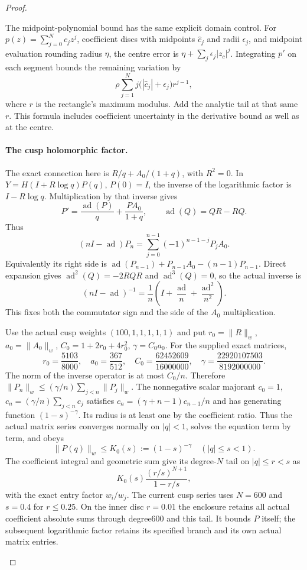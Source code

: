 \documentclass[11pt,a4paper]{article}
\theoremstyle{definition}
\begin{document}
\begin{proof}
\begin{enumerate}[label=\arabic*.]
The midpoint-polynomial bound has the same explicit domain
control. For $p(z)=\sum_{j=0}^Nc_jz^j$, coefficient discs with
midpoints $\widehat c_j$ and radii $\epsilon_j$, and midpoint
evaluation rounding radius $\eta$, the centre error is
$\eta+\sum_j\epsilon_j|z_c|^j$. Integrating $p'$ on each segment
bounds the remaining variation by
\[
 \rho\sum_{j=1}^N j\bigl(|\widehat c_j|+\epsilon_j\bigr)r^{j-1},
\]
where $r$ is the rectangle's maximum modulus. Add the analytic
tail at that same $r$. This formula includes coefficient
uncertainty in the derivative bound as well as at the centre.

\paragraph{The cusp holomorphic factor.}
The exact connection here is
$R/q+A_0/(1+q)$, with $R^2=0$. In
$Y=H(I+R\log q)P(q)$, $P(0)=I$, the inverse of the logarithmic
factor is $I-R\log q$. Multiplication by that inverse gives
\[
 P'=\frac{\operatorname{ad}(P)}q+\frac{PA_0}{1+q},
 \qquad\operatorname{ad}(Q)=QR-RQ.
\]
Thus
\[
 (nI-\operatorname{ad})P_n
  =\sum_{j=0}^{n-1}(-1)^{n-1-j}P_jA_0.
\]
Equivalently its right side is
$\operatorname{ad}(P_{n-1})+P_{n-1}A_0-(n-1)P_{n-1}$.
Direct expansion gives
$\operatorname{ad}^2(Q)=-2RQR$ and
$\operatorname{ad}^3(Q)=0$, so the actual inverse is
\[
 (nI-\operatorname{ad})^{-1}
  =\frac1n\left(I+\frac{\operatorname{ad}}n
                   +\frac{\operatorname{ad}^2}{n^2}\right).
\]
This fixes both the commutator sign and the side of the $A_0$
multiplication.

Use the actual cusp weights $(100,1,1,1,1,1)$ and put
$r_0=\|R\|_w$, $a_0=\|A_0\|_w$,
$C_0=1+2r_0+4r_0^2$, $\gamma=C_0a_0$. For the supplied exact
matrices,
\[
 r_0=\frac{5103}{8000},\quad a_0=\frac{367}{512},\quad
 C_0=\frac{62452609}{16000000},\quad
 \gamma=\frac{22920107503}{8192000000}.
\]
The norm of the inverse operator is at most $C_0/n$. Therefore
$\|P_n\|_w\le(\gamma/n)\sum_{j<n}\|P_j\|_w$.
The nonnegative scalar majorant $c_0=1$,
$c_n=(\gamma/n)\sum_{j<n}c_j$ satisfies
$c_n=(\gamma+n-1)c_{n-1}/n$ and has generating function
$(1-s)^{-\gamma}$. Its radius is at least one by the coefficient
ratio. Thus the actual matrix series converges normally on
$|q|<1$, solves the equation term by term, and obeys
\[
 \|P(q)\|_w\le K_0(s):=(1-s)^{-\gamma}\quad(|q|\le s<1).
\]
The coefficient integral and geometric sum give its degree-$N$
tail on $|q|\le r<s$ as
\[
 K_0(s)\frac{(r/s)^{N+1}}{1-r/s},
\]
with the exact entry factor $w_i/w_j$. The current cusp series
uses $N=600$ and $s=0.4$ for $r\le0.25$. On the inner disc
$r=0.01$ the enclosure retains all actual coefficient absolute
sums through degree600 and this tail. It bounds $P$ itself;
the subsequent logarithmic factor retains its specified branch
and its own actual matrix entries.


\end{enumerate}
\end{proof}
\end{document}

